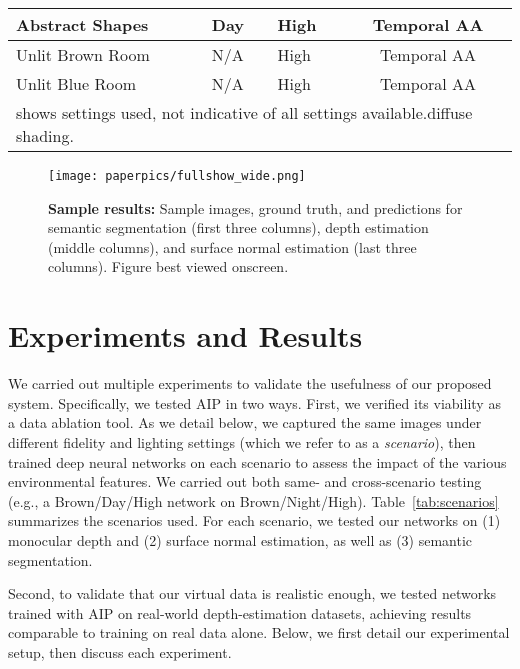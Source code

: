 \documentclass[runningheads]{llncs}
\begin{document}
\begin{table}[h]
{\begin{tabular}{|l|l|l|c|}
\hline
Abstract Shapes                  & Day                        & High                       & Temporal AA                            \\ 
\hline
Unlit Brown Room  & N/A                        & High                       & Temporal AA                            \\ 
\hline
Unlit Blue Room                  & N/A                        & High                       & Temporal AA                            \\ 
\hline
\multicolumn{4}{l}{shows settings used, not indicative of all settings available.diffuse shading.}   
\end{tabular}
}
\end{table}
\vspace{-2em}



\begin{figure}[t]
\centerline{\texttt{[image: paperpics/fullshow\_wide.png]}}
\caption{\textbf{Sample results:} Sample images, ground truth, and predictions for semantic segmentation (first three columns), depth estimation (middle columns), and surface normal estimation (last three columns). Figure best viewed onscreen.}
\label{fig:fullshowcase}
\vspace{-1.25em}
\end{figure}

\section{Experiments and Results}
\label{sec:experiments}
We carried out multiple experiments to validate the usefulness of our proposed system. Specifically, we tested AIP in two ways. First, we verified its viability as a data ablation tool. As we detail below, we captured the same images under different fidelity and lighting settings (which we refer to as a \textit{scenario}), then trained deep neural networks on each scenario to assess the impact of the various environmental features. We carried out both same- and cross-scenario testing (e.g., a Brown/Day/High network on Brown/Night/High). Table~\ref{tab:scenarios} summarizes the scenarios used. For each scenario, we tested our networks on (1) monocular depth and (2) surface normal estimation, as well as (3) semantic segmentation. 

Second, to validate that our virtual data is realistic enough, we tested networks trained with AIP on real-world depth-estimation datasets, achieving results comparable to training on real data alone. Below, we first detail our experimental setup, then discuss each experiment.
\end{document}
